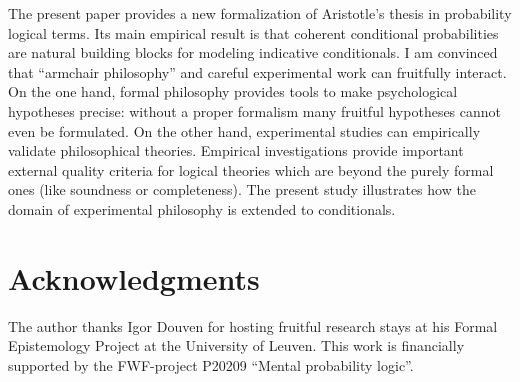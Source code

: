 \documentclass[11pt]{article}
\begin{document}
The present paper provides a new formalization of Aristotle's
thesis in probability logical terms.  Its main empirical result is
that coherent conditional probabilities are natural building blocks
for modeling indicative conditionals. I am convinced that ``armchair
philosophy'' and careful experimental work can fruitfully interact. On
the one hand, formal philosophy provides tools to make psychological
hypotheses precise: without a proper formalism many fruitful
hypotheses cannot even be formulated. On the other hand, experimental
studies can empirically validate philosophical theories.  Empirical
investigations provide important external quality criteria for  logical
theories which are beyond the purely formal ones (like soundness or
completeness). The present study illustrates how the domain of
experimental philosophy is extended to conditionals.



\section{Acknowledgments}
The author thanks Igor Douven for  hosting fruitful research stays at his Formal
   Epistemology Project at the University of Leuven. This work is financially supported by the FWF-project P20209 ``Mental
probability logic''.


\theendnotes
\end{document}
